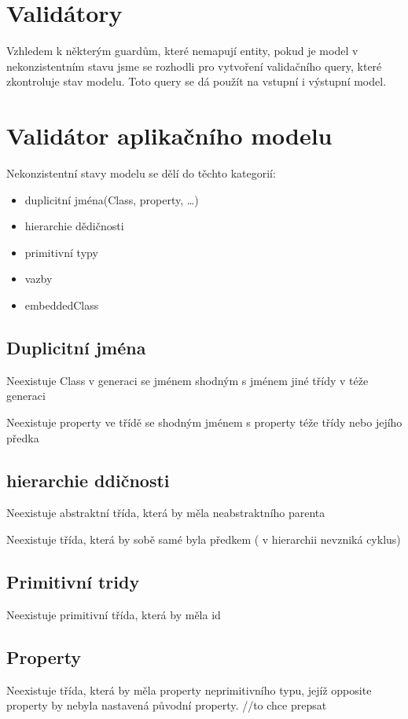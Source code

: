 \documentclass{article}
\begin{document}
\section{Validátory}
Vzhledem k některým guardům, které nemapují entity, pokud je model v
nekonzistentním stavu jsme se rozhodli pro vytvoření validačního query, které
zkontroluje stav modelu. Toto query se dá použít na vstupní  i výstupní model.

\section{Validátor aplikačního modelu}
Nekonzistentní stavy modelu se dělí do těchto kategorií:
\begin{itemize}
  \item duplicitní jména(Class, property, \ldots)
  \item hierarchie dědičnosti
  \item primitivní typy
  \item vazby
  \item embeddedClass
\end{itemize}

\subsection{Duplicitní jména}
Neexistuje Class v generaci se jménem shodným s jménem jiné třídy v téže
generaci \newline

Neexistuje property ve třídě se shodným jménem s property téže třídy nebo jejího
předka

\subsection{hierarchie ddičnosti}
Neexistuje abstraktní třída, která by měla neabstraktního parenta\newline

Neexistuje třída, která by sobě samé byla předkem ( v hierarchii nevzniká
cyklus)

\subsection{Primitivní tridy}
Neexistuje primitivní třída, která by měla id

\subsection{Property}
Neexistuje třída, která by měla property neprimitivního typu, jejíž opposite
property by nebyla nastavená původní property. //to chce prepsat
\end{document}
